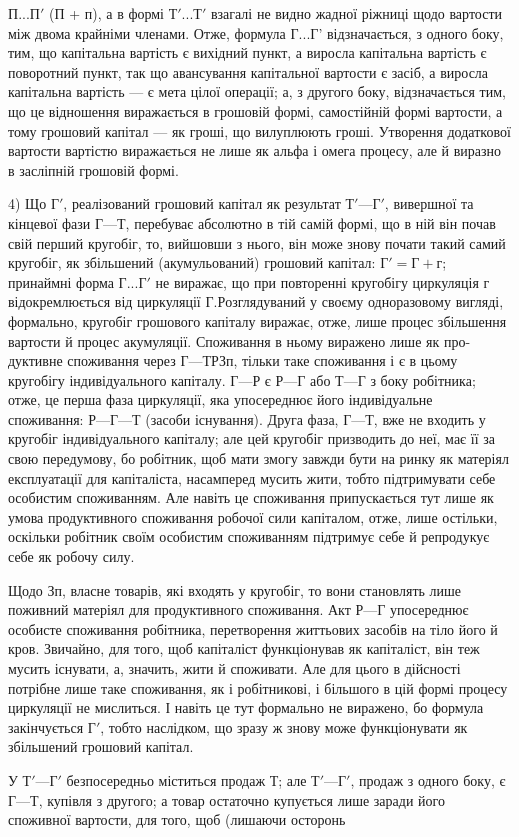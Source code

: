 \parcont{}  %
$П... П'$ (П + п), а в формі $Т'... Т'$ взагалі не видно жадної ріжниці щодо
вартости між двома крайніми членами. Отже, формула $Г... Г$’ відзначається,
з одного боку, тим, що капітальна вартість є вихідний пункт, а виросла
капітальна вартість є поворотний пункт, так що авансування
капітальної вартости є засіб, а виросла капітальна вартість — є мета
цілої операції; а, з другого боку, відзначається тим, що це відношення
виражається в грошовій формі, самостійній формі вартости, а тому грошовий
капітал — як гроші, що вилуплюють гроші. Утворення додаткової
вартости вартістю виражається не лише як альфа і омега процесу,
але й виразно в засліпній грошовій формі.

4) Що $Г'$, реалізований грошовий капітал як результат $Т' — Г'$, вивершної
та кінцевої фази $Г — Т$, перебуває абсолютно в тій самій формі, що в
ній він почав свій перший кругобіг, то, вийшовши з нього, він може
знову почати такий самий кругобіг, як збільшений (акумульований)
грошовий капітал: $Г' = Г + г$; принаймні форма $Г... Г'$ не виражає, що
при повторенні кругобігу циркуляція г відокремлюється від циркуляції $Г.
Р$озглядуваний у своєму одноразовому вигляді, формально, кругобіг
грошового капіталу виражає, отже, лише процес збільшення вартости й
процес акумуляції. Споживання в ньому виражено лише як про-дуктивне споживання через $Г — Т  Р Зп$,
тільки таке споживання
і є в цьому кругобігу індивідуального капіталу. $Г — Р$ є $Р — Г$ або $Т — Г$
з боку робітника; отже, це перша фаза циркуляції, яка упосереднює його
індивідуальне споживання: $Р — Г — Т$ (засоби існування). Друга фаза, $Г — Т$,
вже не входить у кругобіг індивідуального капіталу; але цей кругобіг
призводить до неї, має її за свою передумову, бо робітник, щоб мати
змогу завжди бути на ринку як матеріял експлуатації для капіталіста,
насамперед мусить жити, тобто підтримувати себе особистим споживанням.
Але навіть це споживання припускається тут лише як умова продуктивного
споживання робочої сили капіталом, отже, лише остільки, оскільки
робітник своїм особистим споживанням підтримує себе й репродукує себе
як робочу силу.

Щодо Зп, власне товарів, які входять у кругобіг, то вони
становлять лише поживний матеріял для продуктивного споживання. Акт
$Р — Г$ упосереднює особисте споживання робітника, перетворення життьових
засобів на тіло його й кров. Звичайно, для того, щоб капіталіст
функціонував як капіталіст, він теж мусить існувати, а, значить, жити й
споживати. Але для цього в дійсності потрібне лише таке споживання, як і
робітникові, і більшого в цій формі процесу циркуляції не мислиться.
І навіть це тут формально не виражено, бо формула закінчується $Г'$,
тобто наслідком, що зразу ж знову може функціонувати як збільшений
грошовий капітал.

У $Т' — Г'$ безпосередньо міститься продаж Т; але $Т' — Г'$, продаж з
одного боку, є $Г — Т$, купівля з другого; а товар остаточно купується
лише заради його споживної вартости, для того, щоб (лишаючи осторонь
\parbreak{}  %
